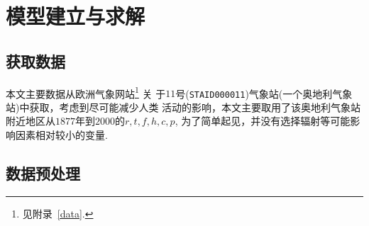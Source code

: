 \documentclass[UTF8, a4paper]{ctexart}
\begin{document}
\section{模型建立与求解}

\subsection{获取数据}

本文主要数据从欧洲气象网站\footnote{见附录~\textcolor{red}{\ref{data}}.} 关
于$11$号(\verb+STAID000011+)气象站(一个奥地利气象站)中获取，考虑到尽可能减少人类
活动的影响，本文主要取用了该奥地利气象站附近地区从$1877$年到$2000$的$r,t,f,h,c,p$,
为了简单起见，并没有选择辐射等可能影响因素相对较小的变量.


\subsection{数据预处理}
\end{document}

